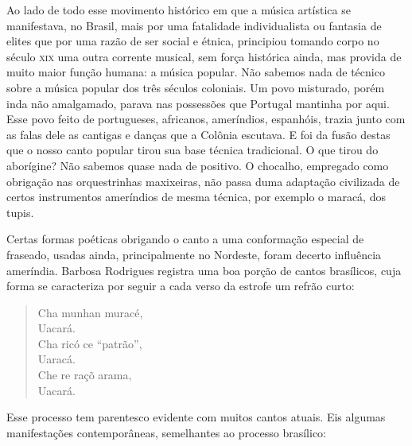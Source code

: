 

Ao lado de todo esse movimento histórico em que a música artística se
manifestava, no Brasil, mais por uma fatalidade individualista ou
fantasia de elites que por uma razão de ser social e étnica, principiou
tomando corpo no século \textsc{xix} uma outra corrente musical, sem força
histórica ainda, mas provida de muito maior função humana: a música
popular. Não sabemos nada de técnico sobre a música popular dos três
séculos coloniais. Um povo misturado, porém inda não amalgamado, parava
nas possessões que Portugal mantinha por aqui. Esse povo feito de
portugueses, africanos, ameríndios, espanhóis, trazia junto com as falas
dele as cantigas e danças que a Colônia escutava. E foi da fusão destas
que o nosso canto popular tirou sua base técnica tradicional. O que
tirou do aborígine? Não sabemos quase nada de positivo. O chocalho,
empregado como obrigação nas orquestrinhas maxixeiras, não passa duma
adaptação civilizada de certos instrumentos ameríndios de mesma técnica,
por exemplo o maracá, dos tupis.

Certas formas poéticas obrigando o canto a uma conformação especial de
fraseado, usadas ainda, principalmente no Nordeste, foram decerto
influência ameríndia. Barbosa Rodrigues registra uma boa porção de
cantos brasílicos, cuja forma se caracteriza por seguir a cada verso da
estrofe um refrão curto:

\begin{verse}
Cha munhan muracé,\\
Uacará.\\
Cha ricó ce ``patrão'',\\
Uaracá.\\
Che re raçõ arama,\\
Uacará.
\end{verse}

Esse processo tem parentesco evidente com muitos cantos atuais. Eis
algumas manifestações contemporâneas, semelhantes ao processo brasílico:

